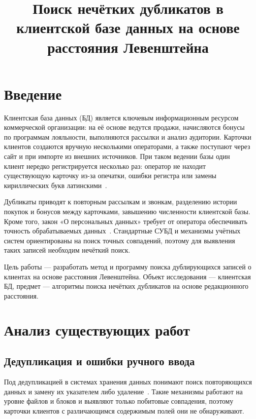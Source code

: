 \documentclass{misisarticle}
\title{Поиск нечётких дубликатов в клиентской базе данных на основе расстояния Левенштейна}
\begin{document}
\maketitle

\section{Введение}

Клиентская база данных (БД) является ключевым информационным ресурсом коммерческой организации: на её основе ведутся продажи, начисляются бонусы по программам лояльности, выполняются рассылки и анализ аудитории. Карточки клиентов создаются вручную несколькими операторами, а также поступают через сайт и при импорте из внешних источников. При таком ведении базы один клиент нередко регистрируется несколько раз: оператор не находит существующую карточку из-за опечатки, ошибки регистра или замены кириллических букв латинскими~\cite{dyadichev2009}.

Дубликаты приводят к повторным рассылкам и звонкам, разделению истории покупок и бонусов между карточками, завышению численности клиентской базы. Кроме того, закон «О персональных данных» требует от оператора обеспечивать точность обрабатываемых данных~\cite{fz152}. Стандартные СУБД и механизмы учётных систем ориентированы на поиск точных совпадений, поэтому для выявления таких записей необходим нечёткий поиск.

Цель работы --- разработать метод и программу поиска дублирующихся записей о клиентах на основе расстояния Левенштейна. Объект исследования --- клиентская БД, предмет --- алгоритмы поиска нечётких дубликатов на основе редакционного расстояния.

\section{Анализ существующих работ}

\subsection{Дедупликация и ошибки ручного ввода}

Под дедупликацией в системах хранения данных понимают поиск повторяющихся данных и замену их указателем либо удаление~\cite{lyashchenko2013}. Такие механизмы работают на уровне файлов и блоков и выявляют только побитовые совпадения, поэтому карточки клиентов с различающимся содержимым полей они не обнаруживают.
\end{document}
